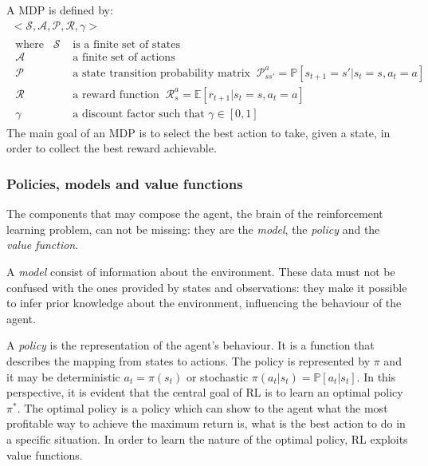 A MDP is defined by:
\begin{equation}\label{eq:mdp}
	\begin{gathered}
		<\mathcal{S}, \mathcal{A}, \mathcal{P}, \mathcal{R}, \gamma>\\
		\begin{aligned}
			\text{where}\hspace{10pt} \mathcal{S} & \text{ is a finite set of states}                     \\
			\mathcal{A}                           & \text{ a finite set of actions}                       \\
			\mathcal{P}                           & \text{ a state transition probability matrix}\;\;
			\mathcal{P}_{ss'}^a = \mathbb{P}[s_{t+1}= s' | s_t = s, a_t = a]                              \\
			\mathcal{R}                           & \text{ a reward function}
			\;\; \mathcal{R}_{s}^a = \mathbb{E}[r_{t+1} | s_t = s, a_t = a]                               \\
			\gamma                                & \text{ a discount factor such that } \gamma \in [0,1]
		\end{aligned}
	\end{gathered}
\end{equation}
The main goal of an MDP is to select the best action to take, given a state, in order to collect the best reward achievable.

\subsubsection{Policies, models and value functions} \label{pmvf}
The components that may compose the agent, the brain of the reinforcement learning problem, can not be missing: they are the \textit{model}, the \textit{policy} and the \textit{value function}.

A \textit{model} consist of information about the environment.
These data must not be confused with the ones provided by states and observations: they make it possible to infer prior knowledge about the environment, influencing the behaviour of the agent.

A \textit{policy} is the representation of the agent's behaviour.
It is a function that describes the mapping from states to actions.
The policy is represented by $\pi$ and it may be deterministic  $a_t = \pi(s_t)$  or stochastic $\pi(a_t|s_t) = \mathbb{P}[a_t | s_t]$.
In this perspective, it is evident that the central goal of RL is to learn an optimal policy $\pi^*$.
The optimal policy is a policy which can show to the agent what the most profitable way to achieve the maximum return is, what is the best action to do in a specific situation.
In order to learn the nature of the optimal policy, RL exploits value functions.


